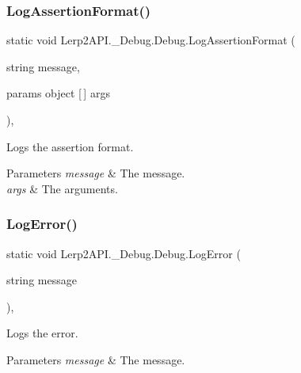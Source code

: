 \subsubsection{\texorpdfstring{Log\+Assertion\+Format()}{LogAssertionFormat()}\hspace{0.1cm}{\footnotesize\ttfamily [2/2]}}
{\footnotesize\ttfamily static void Lerp2\+A\+P\+I.\+\_\+\+Debug.\+Debug.\+Log\+Assertion\+Format (\begin{DoxyParamCaption}\item[{string}]{message,  }\item[{params object \mbox{[}$\,$\mbox{]}}]{args }\end{DoxyParamCaption})\hspace{0.3cm}{\ttfamily [inline]}, {\ttfamily [static]}}



Logs the assertion format. 


\begin{DoxyParams}{Parameters}
{\em message} & The message.\\
\hline
{\em args} & The arguments.\\
\hline
\end{DoxyParams}
\mbox{\label{class_lerp2_a_p_i_1_1___debug_1_1_debug_a3ff51ae3944e1c7d217a89eb811049fc}} 
\subsubsection{\texorpdfstring{Log\+Error()}{LogError()}\hspace{0.1cm}{\footnotesize\ttfamily [1/2]}}
{\footnotesize\ttfamily static void Lerp2\+A\+P\+I.\+\_\+\+Debug.\+Debug.\+Log\+Error (\begin{DoxyParamCaption}\item[{string}]{message }\end{DoxyParamCaption})\hspace{0.3cm}{\ttfamily [inline]}, {\ttfamily [static]}}



Logs the error. 


\begin{DoxyParams}{Parameters}
{\em message} & The message.\\
\hline
\end{DoxyParams}
\mbox{\label{class_lerp2_a_p_i_1_1___debug_1_1_debug_aadfe952784e34731f7206db5ae5bef3c}} 
